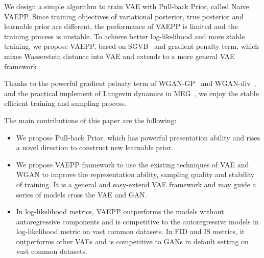 We design a simple algorithm to train VAE with Pull-back Prior, called Naive VAEPP. Since training objectives of variational posterior, true posterior and learnable prior are different, the performance of VAEPP is limited and the training process is unstable. To achieve better log-likelihood and more stable training, we propose VAEPP, based on SGVB~\cite{kingma2014auto} and gradient penalty term, which mixes Wasserstein distance into VAE and extends to a more general VAE framework. 

Thanks to the powerful gradient pelnaty term of WGAN-GP~\cite{gulrajani2017improved} and WGAN-div~\cite{wu2018wasserstein}, and the practical implement of Langevin dynamics in MEG~\cite{kumar2019maximum}, we enjoy the stable efficient training and sampling process. 

The main contributions of this paper are the following:
\begin{itemize}
	\item We propose Pull-back Prior, which has powerful presentation ability and rises a novel direction to construct new learnable prior. 
	\item We propose VAEPP framework to use the existing techniques of VAE and WGAN to improve the representation ability, sampling quality and stability of training. It is a general and easy-extend VAE framework and may guide a series of models cross the VAE and GAN. 
	\item In log-likelihood metrics, VAEPP outperforms the models without autoregressive components and is competitive to the autoregressive models in log-likelihood metric on vast common datasets. In FID and IS metrics, it outperforms other VAEs and is competitive to GANs in default setting on vast common datasets. 
\end{itemize}
